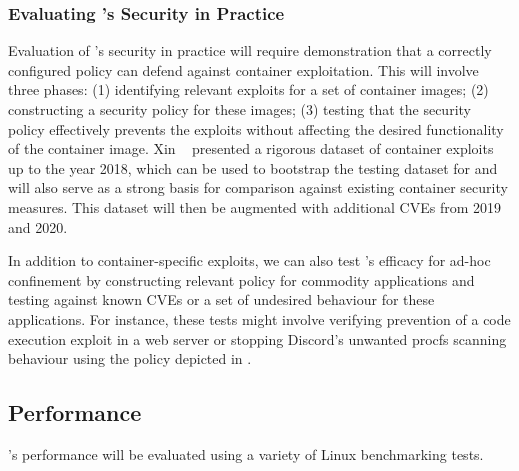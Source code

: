  

\subsubsection{Evaluating \bpfcontain{}'s Security in Practice}

Evaluation of \bpfcontain{}'s security in practice will require demonstration that a correctly configured \bpfcontain{} policy can defend against container exploitation. This will involve three phases: (1) identifying relevant exploits for a set of container images; (2) constructing a security policy for these images; (3) testing that the security policy effectively prevents the exploits without affecting the desired functionality of the container image. Xin \etal~\cite{xin2018_container_security} presented a rigorous dataset of container exploits up to the year 2018, which can be used to bootstrap the testing dataset for \bpfcontain{} and will also serve as a strong basis for comparison against existing container security measures. This dataset will then be augmented with additional CVEs from 2019 and 2020.

In addition to container-specific exploits, we can also test \bpfcontain{}'s efficacy for ad-hoc confinement by constructing relevant \bpfcontain{} policy for commodity applications and testing against known CVEs or a set of undesired behaviour for these applications. For instance, these tests might involve verifying prevention of a code execution exploit in a web server or stopping Discord's unwanted procfs scanning behaviour using the policy depicted in .

\subsection{Performance}

\bpfcontain{}'s performance will be evaluated using a variety of Linux benchmarking tests.

